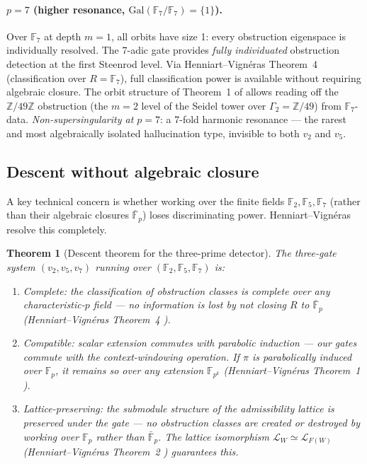 \documentclass[11pt,a4paper]{article}
\newtheorem{theorem}{Theorem}[section]
\begin{document}
\paragraph{$p = 7$ (higher resonance, $\mathrm{Gal}(\mathbb{F}_7/\mathbb{F}_7) = \{1\}$).}
Over $\mathbb{F}_7$ at depth $m=1$, all orbits have size 1:
every obstruction eigenspace is individually resolved.
The 7-adic gate provides \emph{fully individuated} obstruction
detection at the first Steenrod level.
Via Henniart--Vign\'{e}ras Theorem~4 (classification over $R = \mathbb{F}_7$),
full classification power is available without requiring algebraic
closure.
The orbit structure of Theorem~1 of \cite{HV17} allows reading off
the $\mathbb{Z}/49\mathbb{Z}$ obstruction (the $m=2$ level of the
Seidel tower over $\Gamma_2 = \mathbb{Z}/49$) from $\mathbb{F}_7$-data.
\emph{Non-supersingularity at $p=7$}: a 7-fold harmonic resonance ---
the rarest and most algebraically isolated hallucination type,
invisible to both $v_2$ and $v_5$.

\subsection{Descent without algebraic closure}
\label{sec:descent}

A key technical concern is whether working over the finite fields
$\mathbb{F}_2, \mathbb{F}_5, \mathbb{F}_7$ (rather than their
algebraic closures $\bar{\mathbb{F}}_p$) loses discriminating power.
Henniart--Vign\'{e}ras resolve this completely.

\begin{theorem}[Descent theorem for the three-prime detector]
\label{thm:descent}
The three-gate system $(v_2, v_5, v_7)$ running over
$(\mathbb{F}_2, \mathbb{F}_5, \mathbb{F}_7)$ is:
\begin{enumerate}[label=(\roman*)]
  \item \emph{Complete}: the classification of obstruction classes
        is complete over any characteristic-$p$ field --- no
        information is lost by not closing $R$ to $\bar{\mathbb{F}}_p$
        (Henniart--Vign\'{e}ras Theorem~4 \cite{HV17}).
  \item \emph{Compatible}: scalar extension commutes with parabolic
        induction --- our gates commute with the context-windowing
        operation. If $\pi$ is parabolically induced over $\mathbb{F}_p$,
        it remains so over any extension $\mathbb{F}_{p^k}$
        (Henniart--Vign\'{e}ras Theorem~1 \cite{HV17}).
  \item \emph{Lattice-preserving}: the submodule structure of the
        admissibility lattice is preserved under the gate --- no
        obstruction classes are created or destroyed by working over
        $\mathbb{F}_p$ rather than $\bar{\mathbb{F}}_p$.
        The lattice isomorphism $\mathcal{L}_W \simeq \mathcal{L}_{F(W)}$
        (Henniart--Vign\'{e}ras Theorem~2 \cite{HV17}) guarantees this.
\end{enumerate}
\end{theorem}
\end{document}
